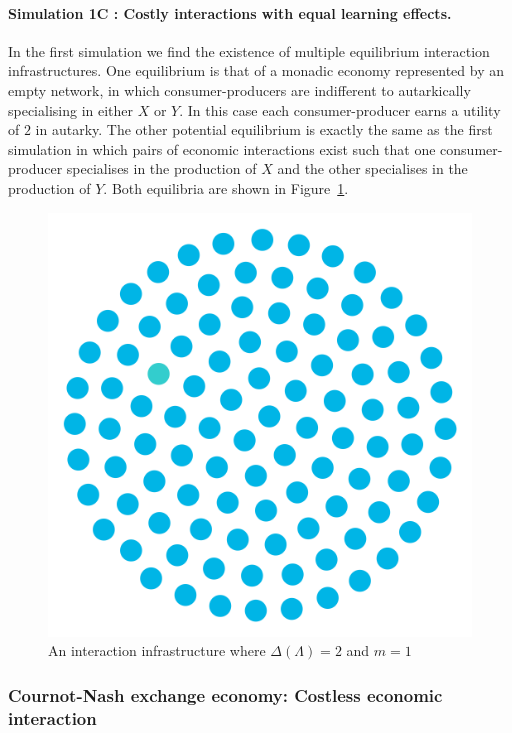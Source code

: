 \paragraph{Simulation 1C : Costly interactions with equal learning effects.}

In the first simulation we find the existence of multiple equilibrium interaction infrastructures. One equilibrium is that of a monadic economy represented by an empty network, in which consumer-producers are indifferent to autarkically specialising in either $X$ or $Y$. In this case each consumer-producer earns a utility of $2$ in autarky. The other potential equilibrium is exactly the same as the first simulation in which pairs of economic interactions exist such that one consumer-producer specialises in the production of $X$ and the other specialises in the production of $Y$. Both equilibria are shown in Figure~\ref{Sim3}.

\begin{figure}[t]
\centering
\includegraphics[scale=0.22]{Images/Sim3E.png}
\caption{An interaction infrastructure where $\Delta(\Lambda)=2$ and $m=1$}
\label{Sim3}
\end{figure}

\subsubsection{Cournot-Nash exchange economy: Costless economic interaction}

